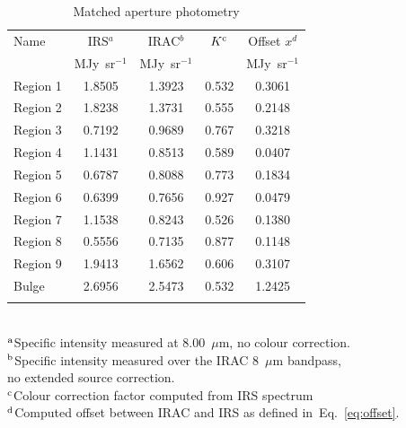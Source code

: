 \begin{table}
 \centering
 \begin{minipage}{100mm}
\caption{Matched aperture photometry}
  \begin{tabular}{lcccc}
  \hline{Name}&{IRS$^{a}$}&{IRAC$^{b}$}&{$K^{\rm c}$}&{Offset $x^d$} \\ 
{} & { MJy~sr$^{-1}$} & { MJy~sr$^{-1}$} & &  MJy~sr$^{-1}$
   \\
 \hline
 Region 1 & 1.8505 & 1.3923 & 0.532 & 0.3061
 \\ Region 2  & 1.8238 & 1.3731 & 0.555 & 0.2148
 \\ Region 3 & 0.7192 & 0.9689 & 0.767 & 0.3218
 \\ Region 4 & 1.1431 & 0.8513 & 0.589 & 0.0407
 \\  Region 5 & 0.6787 & 0.8088 & 0.773 & 0.1834
 \\  Region 6  & 0.6399 & 0.7656 & 0.927 & 0.0479
 \\  Region 7  & 1.1538 & 0.8243 & 0.526 & 0.1380
 \\ Region 8 & 0.5556 & 0.7135 & 0.877 & 0.1148
 \\  Region 9 & 1.9413 & 1.6562 & 0.606 & 0.3107 
 \\ Bulge & 2.6956 & 2.5473 & 0.532 & 1.2425\\
\hline
 \label{colourK}
\end{tabular}\\
 {$^{\rm a}$Specific intensity measured at 8.00~$\mu$m, no colour correction.\\
 $^{\rm b}$Specific intensity measured over the IRAC 8~$\mu$m bandpass,\\ no extended source correction.\\
$^{\rm c}$Colour correction factor computed from IRS spectrum\\
 $^{\rm d}$Computed offset between IRAC and IRS as defined in~Eq.~\ref{eq:offset}. }
\end{minipage}
\end{table}

	


